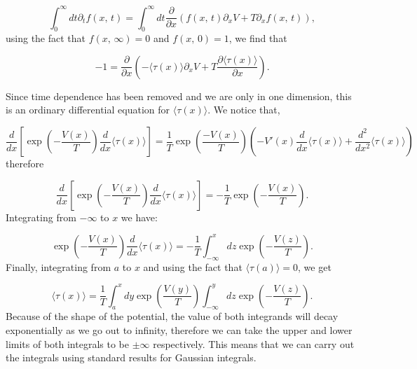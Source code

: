 \begin{equation}
\int_0^{\infty} dt \partial_t f(x, \, t) = \int_0^{\infty} dt \frac{\partial}{\partial x} \left ( f(x, \, t) \partial_x V + T \partial_x f(x, \, t) \right),
\end{equation}
using the fact that $f(x, \, \infty) = 0$ and $f(x, \, 0) = 1$, we find that

\begin{equation}
-1 = \frac{\partial}{\partial x} \left (-\langle \tau(x) \rangle \partial_x V + T \frac{ \partial \langle \tau(x) \rangle}{\partial x} \right).
\end{equation}

Since time dependence has been removed and we are only in one dimension, this is an ordinary differential equation for $\langle \tau(x) \rangle$. We notice that,

\begin{equation}
\frac{d}{dx} \left [\exp \left (-\frac{V(x)}{T} \right) \frac{d}{dx} \langle \tau(x) \rangle \right] = \frac{1}{T} \exp \left (\frac{-V(x)}{T} \right ) \left (- V'(x) \frac{d}{dx} \langle \tau(x) \rangle + \frac{d^2}{dx^2} \langle \tau(x) \rangle \right)
\end{equation}
therefore

\begin{equation}
\frac{d}{dx} \left [\exp \left (-\frac{V(x)}{T} \right) \frac{d}{dx} \langle \tau(x) \rangle \right] = -\frac{1}{T} \exp \left(-\frac{V(x)}{T} \right).
\end{equation}
Integrating from $-\infty$ to $x$ we have:

\begin{equation}
\exp \left (-\frac{V(x)}{T} \right) \frac{d}{dx} \langle \tau(x) \rangle = -\frac{1}{T} \int_{-\infty}^x dz \exp \left(-\frac{V(z)}{T} \right).
\end{equation}
Finally, integrating from $a$ to $x$ and using the fact that $\langle \tau(a) \rangle = 0$, we get

\begin{equation}
\langle \tau(x) \rangle = \frac{1}{T} \int_a^{x} dy \exp \left(\frac{V(y)}{T} \right) \int_{-\infty}^y dz \exp \left(-\frac{V(z)}{T} \right).
\end{equation}
Because of the shape of the potential, the value of both integrands will decay exponentially as we go out to infinity, therefore we can take the upper and lower limits of both integrals to be $\pm \infty$ respectively. This means that we can carry out the integrals using standard results for Gaussian integrals.

